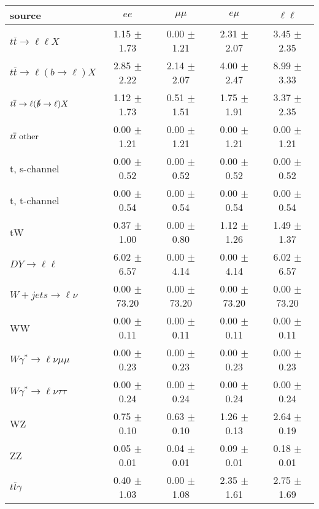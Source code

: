 \begin{tabular}{l|cccc} \hline\hline
source & $ee$ & $\mu\mu$ & $e\mu$ & $\ell\ell $ \\
\hline
$t\overline{t} \rightarrow \ell \ell X$ &  1.15 $\pm$  1.73 &  0.00 $\pm$  1.21 &  2.31 $\pm$  2.07 &  3.45 $\pm$  2.35 \\
$t\overline{t} \rightarrow \ell (b \rightarrow \ell) X$ &  2.85 $\pm$  2.22 &  2.14 $\pm$  2.07 &  4.00 $\pm$  2.47 &  8.99 $\pm$  3.33 \\
$t\overline{t} \rightarrow \ell (\slashed b \rightarrow \ell) X$ &  1.12 $\pm$  1.73 &  0.51 $\pm$  1.51 &  1.75 $\pm$  1.91 &  3.37 $\pm$  2.35 \\
        $t\overline{t}\ \rm{other}$ &  0.00 $\pm$  1.21 &  0.00 $\pm$  1.21 &  0.00 $\pm$  1.21 &  0.00 $\pm$  1.21 \\
\hline
                       t, s-channel &  0.00 $\pm$  0.52 &  0.00 $\pm$  0.52 &  0.00 $\pm$  0.52 &  0.00 $\pm$  0.52 \\
                       t, t-channel &  0.00 $\pm$  0.54 &  0.00 $\pm$  0.54 &  0.00 $\pm$  0.54 &  0.00 $\pm$  0.54 \\
                                 tW &  0.37 $\pm$  1.00 &  0.00 $\pm$  0.80 &  1.12 $\pm$  1.26 &  1.49 $\pm$  1.37 \\
\hline
         $DY \rightarrow \ell \ell$ &  6.02 $\pm$  6.57 &  0.00 $\pm$  4.14 &  0.00 $\pm$  4.14 &  6.02 $\pm$  6.57 \\
      $W+jets \rightarrow \ell \nu$ &  0.00 $\pm$ 73.20 &  0.00 $\pm$ 73.20 &  0.00 $\pm$ 73.20 &  0.00 $\pm$ 73.20 \\
                                 WW &  0.00 $\pm$  0.11 &  0.00 $\pm$  0.11 &  0.00 $\pm$  0.11 &  0.00 $\pm$  0.11 \\
\hline
$W\gamma^{*} \rightarrow \ell \nu \mu\mu$ &  0.00 $\pm$  0.23 &  0.00 $\pm$  0.23 &  0.00 $\pm$  0.23 &  0.00 $\pm$  0.23 \\
$W\gamma^{*} \rightarrow \ell \nu \tau\tau$ &  0.00 $\pm$  0.24 &  0.00 $\pm$  0.24 &  0.00 $\pm$  0.24 &  0.00 $\pm$  0.24 \\
                                 WZ &  0.75 $\pm$  0.10 &  0.63 $\pm$  0.10 &  1.26 $\pm$  0.13 &  2.64 $\pm$  0.19 \\
                                 ZZ &  0.05 $\pm$  0.01 &  0.04 $\pm$  0.01 &  0.09 $\pm$  0.01 &  0.18 $\pm$  0.01 \\
\hline
              $t\overline{t}\gamma$ &  0.40 $\pm$  1.03 &  0.00 $\pm$  1.08 &  2.35 $\pm$  1.61 &  2.75 $\pm$  1.69 \\

\end{tabular}
